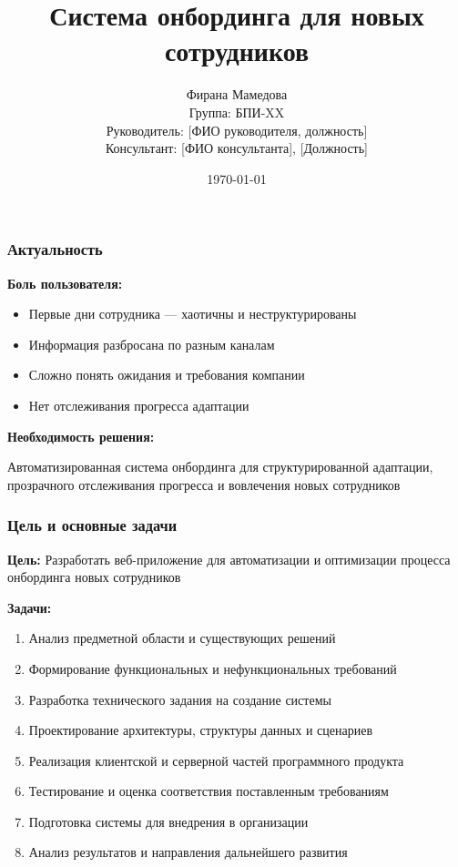 \documentclass[aspectratio=43,11pt]{beamer}
\title[Система онбординга]{Система онбординга для новых сотрудников}
\author{
    Фирана Мамедова \\
    \vspace{0.3cm}
    Группа: БПИ-XX \\
    \vspace{0.3cm}
    Руководитель: [ФИО руководителя, должность] \\
    \vspace{0.3cm}
    {\small Консультант: [ФИО консультанта], [Должность] \\
    [Место работы]}
}
\date{\today}
\begin{document}
\begin{frame}[plain]
    \titlepage
    \addtocounter{framenumber}{-1}
\end{frame}

\begin{frame}
    \frametitle{Актуальность}
    
    \textbf{Боль пользователя:}
    \begin{itemize}
        \item Первые дни сотрудника — хаотичны и неструктурированы
        
        \item Информация разбросана по разным каналам
        
        \item Сложно понять ожидания и требования компании
        
        \item Нет отслеживания прогресса адаптации
    \end{itemize}
    
    \bigskip
    
    \textbf{Необходимость решения:}
    
    Автоматизированная система онбординга для структурированной адаптации, прозрачного отслеживания прогресса и вовлечения новых сотрудников
\end{frame}

\begin{frame}
    \frametitle{Цель и основные задачи}
    
    \textbf{Цель:} Разработать веб-приложение для автоматизации и оптимизации процесса онбординга новых сотрудников
    
    \bigskip
    
    \textbf{Задачи:}
    \begin{enumerate}
        \item Анализ предметной области и существующих решений
        \item Формирование функциональных и нефункциональных требований
        \item Разработка технического задания на создание системы
        \item Проектирование архитектуры, структуры данных и сценариев
        \item Реализация клиентской и серверной частей программного продукта
        \item Тестирование и оценка соответствия поставленным требованиям
        \item Подготовка системы для внедрения в организации
        \item Анализ результатов и направления дальнейшего развития
    \end{enumerate}
\end{frame}
\end{document}
